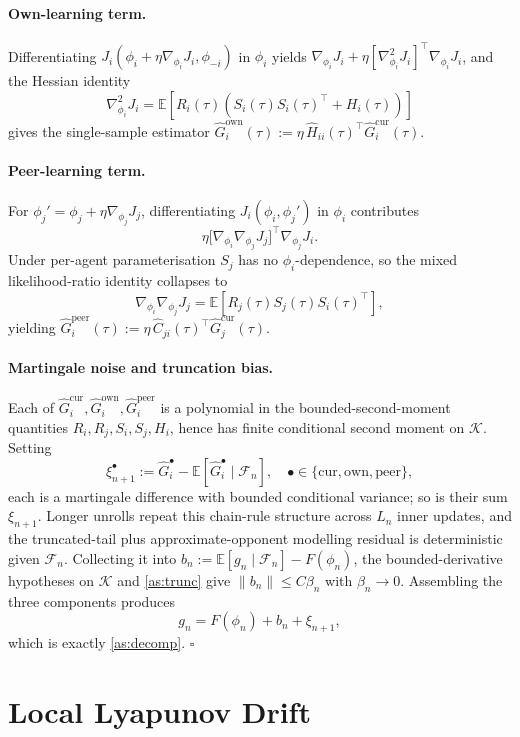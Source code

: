 \documentclass{nextgame2026} %
\newcommand{\E}{\mathbb{E}}
\newcommand{\K}{\mathcal{K}}
\newcommand{\F}{\mathcal{F}}
\begin{document}
\paragraph{Own-learning term.}
Differentiating $J_i(\phi_i+\eta\nabla_{\phi_i}J_i,\phi_{-i})$ in $\phi_i$ yields
$\nabla_{\phi_i}J_i+\eta[\nabla_{\phi_i}^2J_i]^\top\nabla_{\phi_i}J_i$, and the Hessian identity
\[
\nabla_{\phi_i}^2J_i
=\E\!\left[R_i(\tau)\!\left(S_i(\tau)S_i(\tau)^\top+H_i(\tau)\right)\right]
\]
gives the single-sample estimator
$\widehat G_i^{\mathrm{own}}(\tau):=\eta\,\widehat H_{ii}(\tau)^\top\widehat G_i^{\mathrm{cur}}(\tau)$.

\paragraph{Peer-learning term.}
For $\phi_j'=\phi_j+\eta\nabla_{\phi_j}J_j$, differentiating $J_i(\phi_i,\phi_j')$ in $\phi_i$ contributes
\[
\eta\bigl[\nabla_{\phi_i}\nabla_{\phi_j}J_j\bigr]^\top\nabla_{\phi_j}J_i.
\]
Under per-agent parameterisation $S_j$ has no $\phi_i$-dependence, so the mixed likelihood-ratio identity collapses to
\[
\nabla_{\phi_i}\nabla_{\phi_j}J_j
=\E\!\left[R_j(\tau)S_j(\tau)S_i(\tau)^\top\right],
\]
yielding $\widehat G_i^{\mathrm{peer}}(\tau):=\eta\,\widehat C_{ji}(\tau)^\top\widehat G_j^{\mathrm{cur}}(\tau)$.

\paragraph{Martingale noise and truncation bias.}
Each of $\widehat G_i^{\mathrm{cur}},\widehat G_i^{\mathrm{own}},\widehat G_i^{\mathrm{peer}}$ is a polynomial in the bounded-second-moment quantities $R_i,R_j,S_i,S_j,H_i$, hence has finite conditional second moment on $\K$. Setting
\[
\xi_{n+1}^{\bullet}:=\widehat G_i^{\bullet}-\E[\widehat G_i^{\bullet}\mid\F_n],\quad \bullet\in\{\mathrm{cur},\mathrm{own},\mathrm{peer}\},
\]
each is a martingale difference with bounded conditional variance; so is their sum $\xi_{n+1}$. Longer unrolls repeat this chain-rule structure across $L_n$ inner updates, and the truncated-tail plus approximate-opponent modelling residual is deterministic given $\F_n$. Collecting it into $b_n:=\E[g_n\mid\F_n]-F(\phi_n)$, the bounded-derivative hypotheses on $\K$ and \cref{as:trunc} give $\|b_n\|\le C\beta_n$ with $\beta_n\to0$. Assembling the three components produces
\[
g_n=F(\phi_n)+b_n+\xi_{n+1},
\]
which is exactly \cref{as:decomp}. $\square$

\section{Local Lyapunov Drift}\label{app:lyapunov}
\end{document}
